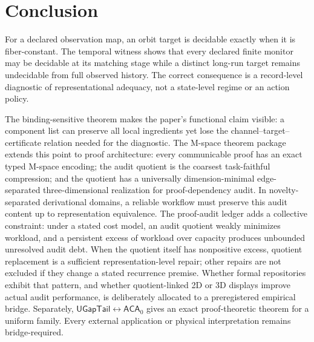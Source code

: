 \documentclass[11pt]{article}
\newcommand{\ACA}{\ensuremath{\mathsf{ACA}_0}}
\newcommand{\UGapTail}{\ensuremath{\mathsf{UGapTail}}}
\theoremstyle{plain}
\theoremstyle{definition}
\theoremstyle{remark}
\begin{document}
\section{Conclusion}

For a declared observation map, an orbit target is decidable exactly when it is
fiber-constant.  The temporal witness shows that every declared finite monitor
may be decidable at its matching stage while a distinct long-run target remains
undecidable from full observed history.  The correct consequence is a
record-level diagnostic of representational adequacy, not a state-level regime or
an action policy.

The binding-sensitive theorem makes the paper's functional claim visible: a
component list can preserve all local ingredients yet lose the channel--target--
certificate relation needed for the diagnostic.  The M-space theorem package
extends this point to proof architecture: every communicable proof has an exact
typed M-space encoding; the audit quotient is the coarsest task-faithful
compression; and the quotient has a universally dimension-minimal
edge-separated three-dimensional realization for proof-dependency audit.  In
novelty-separated derivational domains, a reliable workflow must preserve this
audit content up to representation equivalence.  The proof-audit ledger adds a
collective constraint: under a stated cost model, an audit quotient weakly
minimizes workload, and a persistent excess of workload over capacity produces
unbounded unresolved audit debt.  When the quotient itself has nonpositive
excess, quotient replacement is a sufficient representation-level repair;
other repairs are not excluded if they change a stated recurrence premise.
Whether formal repositories exhibit that pattern, and whether quotient-linked
2D or 3D displays improve actual audit performance, is deliberately allocated
to a preregistered empirical bridge.
Separately, $\UGapTail\leftrightarrow\ACA$ gives an exact proof-theoretic theorem
for a uniform family.  Every external application or physical interpretation
remains bridge-required.
\end{document}
